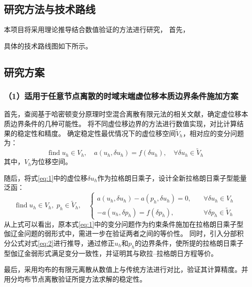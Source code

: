 \setlength{\abovedisplayskip}{0pt}
\setlength{\belowdisplayskip}{0pt}

\subsection{研究方法与技术路线}

本项目将采用理论推导结合数值验证的方法进行研究，
首先，

具体的技术路线图如下所示。

\subsection{研究方案}

\subsubsection*{\bfseries （1）适用于任意节点离散的时域末端虚位移本质边界条件施加方案}
首先，查阅基于哈密顿变分原理时空混合离散有限元法的相关文献，确定虚位移本质边界条件的几种可能性。
将不同虚位移边界的方法进行数值实现，对比计算结果的稳定性和精度。
确定稳定性最优情况下的虚位移空间$\tilde V_h$，相对应的变分问题为：
\begin{equation}
    \text{find} \; u_h \in V_h, \quad a(u_h, \delta u_h) = f(\delta u_h), \quad \forall \delta u_h \in \tilde V_h
    \label{eq:1}
\end{equation}
其中，$V_h$为位移空间。

随后，将式\eqref{eq:1}中的虚位移$\delta u_h$作为拉格朗日乘子，设计全新拉格朗日乘子型能量泛函：
\begin{equation}
    \text{find} \; u_h \in V_h,\; p_h \in \tilde V_h, \quad
    \left \{
    \begin{split} 
        a(u_h, \delta u_h) - a(p_h, \delta u_h) = 0,\quad &\forall \delta u_h \in V_h \\
        - a(u_h, \delta p_h) = f(\delta p_h),\quad &\forall \delta p_h \in \tilde V_h
    \end{split}
    \right .
    \label{eq:2}
\end{equation}
从上式可以看出，原本式\eqref{eq:1}中的变分问题作为约束条件施加在拉格朗日乘子型伽辽金问题的弱形式中，需进一步在验证两者之间的等价性。
同时，引入分部积分公式对式\eqref{eq:2}进行推导，通过修正$u_h$和$p_h$的边界条件，使所提的拉格朗日乘子型伽辽金弱形式满足变分一致性，并证明其与欧拉--拉格朗日方程等价。

最后，采用均布的有限元离散从数值上与传统方法进行对比，验证其计算精度。并用分均布节点离散验证所提方法求解的稳定性。

